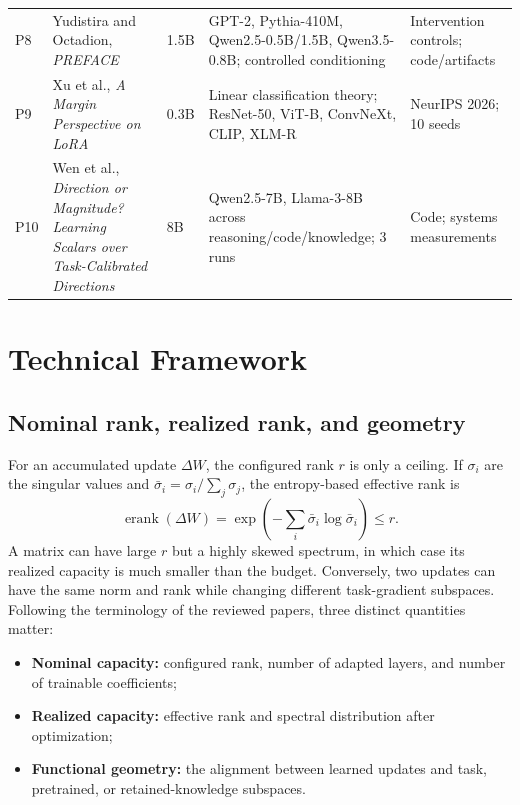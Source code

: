 \documentclass[11pt]{article}
\newcommand{\erank}{\operatorname{erank}}
\begin{document}
\begin{table}[t]
\begin{tabularx}{\textwidth}{@{}p{}p{}p{}p{}X@{}}
P8 & Yudistira and Octadion, \emph{PREFACE} \cite{yudistira2026preface} & 1.5B & GPT-2, Pythia-410M, Qwen2.5-0.5B/1.5B, Qwen3.5-0.8B; controlled conditioning & Intervention controls; code/artifacts \\
P9 & Xu et al., \emph{A Margin Perspective on LoRA} \cite{xu2026malora} & 0.3B & Linear classification theory; ResNet-50, ViT-B, ConvNeXt, CLIP, XLM-R & NeurIPS 2026; 10 seeds \\
P10 & Wen et al., \emph{Direction or Magnitude? Learning Scalars over Task-Calibrated Directions} \cite{wen2026scalar} & 8B & Qwen2.5-7B, Llama-3-8B across reasoning/code/knowledge; 3 runs & Code; systems measurements \\
\bottomrule
\end{tabularx}
\end{table}

\section{Technical Framework}

\subsection{Nominal rank, realized rank, and geometry}

For an accumulated update $\Delta W$, the configured rank $r$ is only a ceiling. If $\sigma_i$ are the singular values and
$\bar{\sigma}_i=\sigma_i/\sum_j\sigma_j$, the entropy-based effective rank is
\begin{equation}
\erank(\Delta W)
= \exp\!\left(-\sum_i \bar{\sigma}_i\log \bar{\sigma}_i\right)
\le r.
\label{eq:erank}
\end{equation}
A matrix can have large $r$ but a highly skewed spectrum, in which case its realized capacity is much smaller than the budget. Conversely, two updates can have the same norm and rank while changing different task-gradient subspaces. Following the terminology of the reviewed papers, three distinct quantities matter:
\begin{itemize}
  \item \textbf{Nominal capacity:} configured rank, number of adapted layers, and number of trainable coefficients;
  \item \textbf{Realized capacity:} effective rank and spectral distribution after optimization;
  \item \textbf{Functional geometry:} the alignment between learned updates and task, pretrained, or retained-knowledge subspaces.
\end{itemize}
\end{document}
